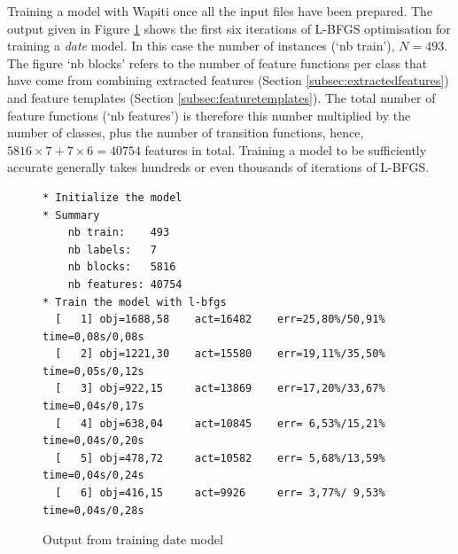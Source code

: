 Training a model with Wapiti once all the input files have been prepared. The output given in Figure \ref{fig:output} shows the first six iterations of L-BFGS optimisation for training a \emph{date} model. In this case the number of instances (`nb train'), $N = 493$. The figure `nb blocks' refers to the number of feature functions per class that have come from combining extracted features (Section \ref{subsec:extractedfeatures}) and feature templates (Section \ref{subsec:featuretemplates}). The total number of feature functions (`nb features') is therefore this number multiplied by the number of classes, plus the number of transition functions, hence, $5816 \times 7 + 7 \times 6 = 40754$ features in total. Training a model to be sufficiently accurate generally takes hundreds or even thousands of iterations of L-BFGS.

\begin{figure}
\centering
\begin{BVerbatim}
* Initialize the model
* Summary
    nb train:    493
    nb labels:   7
    nb blocks:   5816
    nb features: 40754
* Train the model with l-bfgs
  [   1] obj=1688,58    act=16482    err=25,80%/50,91% time=0,08s/0,08s
  [   2] obj=1221,30    act=15580    err=19,11%/35,50% time=0,05s/0,12s
  [   3] obj=922,15     act=13869    err=17,20%/33,67% time=0,04s/0,17s
  [   4] obj=638,04     act=10845    err= 6,53%/15,21% time=0,04s/0,20s
  [   5] obj=478,72     act=10582    err= 5,68%/13,59% time=0,04s/0,24s
  [   6] obj=416,15     act=9926     err= 3,77%/ 9,53% time=0,04s/0,28s
\end{BVerbatim}
\caption{Output from training date model}
\label{fig:output}
\end{figure}
